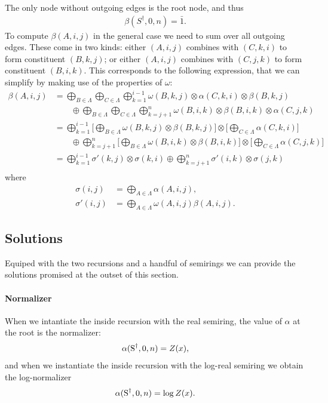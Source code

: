   The only node without outgoing edges is the root node, and thus
  \begin{align*}
    \beta(S^{\dagger}, 0, n) = \bar{1}.
  \end{align*}
  To compute $\beta(A, i, j)$ in the general case we need to sum over all outgoing edges. These come in two kinds: either $(A, i, j)$ combines with $(C, k, i)$ to form constituent $(B, k, j)$; or either $(A, i, j)$ combines with $(C, j, k)$ to form constituent $(B, i, k)$. This corresponds to the following expression, that we can simplify by making use of the properties of $\omega$:
  \begin{align*}
    \beta(A, i, j)
      &= \bigoplus_{B \in \Lambda} \bigoplus_{C \in \Lambda} \bigoplus_{k=1}^{i-1} \omega(B, k, j) \otimes \alpha(C, k, i) \otimes \beta(B, k, j) \\
        &\qquad \oplus \bigoplus_{B \in \Lambda} \bigoplus_{C \in \Lambda} \bigoplus_{k=j+1}^{n} \omega(B, i, k) \otimes \beta(B, i, k) \otimes \alpha(C, j, k) \\
      &=  \bigoplus_{k=1}^{i-1}  \Bigg[ \bigoplus_{B \in \Lambda} \omega(B, k, j)  \otimes \beta(B, k, j) \Bigg] \otimes \Bigg[ \bigoplus_{C \in \Lambda} \alpha(C, k, i) \Bigg] \\
        &\qquad \oplus \bigoplus_{k=j+1}^{n}  \Bigg[ \bigoplus_{B \in \Lambda}  \omega(B, i, k) \otimes \beta(B, i, k) \Bigg] \otimes  \Bigg[  \bigoplus_{C \in \Lambda} \alpha(C, j, k) \Bigg] \\
      &=  \bigoplus_{k=1}^{i-1}  \sigma'(k, j) \otimes \sigma(k, i) \oplus \bigoplus_{k=j+1}^{n} \sigma'(i, k) \otimes  \sigma(j, k) \\
  \end{align*}
  where
  \begin{align*}
      \sigma(i, j) &= \bigoplus_{A \in \Lambda} \alpha(A, i, j),  \\
      \sigma'(i, j) &= \bigoplus_{A \in \Lambda} \omega(A, i, j) \beta(A, i, j).
  \end{align*}

\subsection{Solutions}
  Equiped with the two recursions and a handful of semirings we can provide the solutions promised at the outset of this section.

  \paragraph{Normalizer}
    When we intantiate the inside recursion with the real semiring, the value of $\alpha$ at the root is the normalizer:
    \begin{align*}
      \alpha(\text{S}^{\dagger}, 0, n) = Z(x),
    \end{align*}
    and when we instantiate the inside recursion with the log-real semiring we obtain the log-normalizer
    \begin{align*}
      \alpha(\text{S}^{\dagger}, 0, n) = \log Z(x).
    \end{align*}

